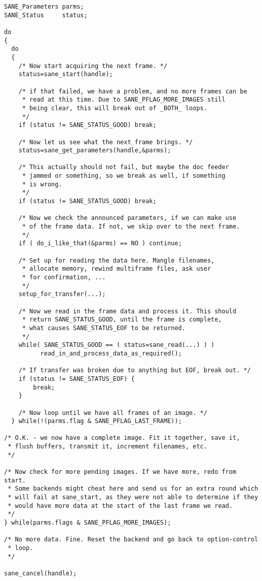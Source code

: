\documentclass[11pt,DVIps]{report}
\begin{document}
\begin{changebar}
\begin{verbatim}
SANE_Parameters parms; 
SANE_Status     status; 

do
{ 
  do
  { 
    /* Now start acquiring the next frame. */ 
    status=sane_start(handle); 

    /* if that failed, we have a problem, and no more frames can be 
     * read at this time. Due to SANE_PFLAG_MORE_IMAGES still 
     * being clear, this will break out of _BOTH_ loops. 
     */ 
    if (status != SANE_STATUS_GOOD) break; 

    /* Now let us see what the next frame brings. */ 
    status=sane_get_parameters(handle,&parms); 

    /* This actually should not fail, but maybe the doc feeder 
     * jammed or something, so we break as well, if something 
     * is wrong. 
     */ 
    if (status != SANE_STATUS_GOOD) break; 

    /* Now we check the announced parameters, if we can make use 
     * of the frame data. If not, we skip over to the next frame. 
     */ 
    if ( do_i_like_that(&parms) == NO ) continue; 

    /* Set up for reading the data here. Mangle filenames, 
     * allocate memory, rewind multiframe files, ask user 
     * for confirmation, ... 
     */ 
    setup_for_transfer(...); 

    /* Now we read in the frame data and process it. This should 
     * return SANE_STATUS_GOOD, until the frame is complete, 
     * what causes SANE_STATUS_EOF to be returned. 
     */ 
    while( SANE_STATUS_GOOD == ( status=sane_read(...) ) ) 
          read_in_and_process_data_as_required(); 

    /* If transfer was broken due to anything but EOF, break out. */ 
    if (status != SANE_STATUS_EOF) { 
        break; 
    } 

    /* Now loop until we have all frames of an image. */ 
  } while(!(parms.flag & SANE_PFLAG_LAST_FRAME));

/* O.K. - we now have a complete image. Fit it together, save it, 
 * flush buffers, transmit it, increment filenames, etc. 
 */ 

/* Now check for more pending images. If we have more, redo from start. 
 * Some backends might cheat here and send us for an extra round which 
 * will fail at sane_start, as they were not able to determine if they 
 * would have more data at the start of the last frame we read. 
 */ 
} while(parms.flags & SANE_PFLAG_MORE_IMAGES); 

/* No more data. Fine. Reset the backend and go back to option-control 
 * loop. 
 */ 

sane_cancel(handle); 
\end{verbatim}

\end{changebar}
\end{document}
